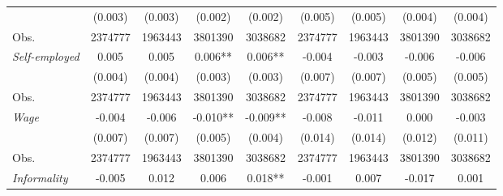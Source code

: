 \begin{tabular}{lcccccccc}
						&   \tiny{(0.003)}   &
						    \tiny{(0.003)}   &
						    \tiny{(0.002)}   &
						    \tiny{(0.002)}   &
						    \tiny{(0.005)}   &
						    \tiny{(0.005)}   &
						    \tiny{(0.004)}   &
						    \tiny{(0.004)}   \\


Obs.					&	\tiny{2374777}   &
						    \tiny{1963443}   &
						    \tiny{3801390}   &
						    \tiny{3038682}   &
						    \tiny{2374777}   &
						    \tiny{1963443}   &
						    \tiny{3801390}   &
						    \tiny{3038682}   \\



\textit{Self-employed}   &  0.005   &
						   0.005   &
						   0.006**   &
						   0.006**   &
						   -0.004   &
						   -0.003   &
						   -0.006   &
						   -0.006   \\
						   
						&   \tiny{(0.004)}   &
						    \tiny{(0.004)}   &
						    \tiny{(0.003)}   &
						    \tiny{(0.003)}   &
						    \tiny{(0.007)}   &
						    \tiny{(0.007)}   &
						    \tiny{(0.005)}   &
						    \tiny{(0.005)}   \\

Obs.					&	\tiny{2374777}   &
						    \tiny{1963443}   &
						    \tiny{3801390}   &
						    \tiny{3038682}   &
						    \tiny{2374777}   &
						    \tiny{1963443}   &
						    \tiny{3801390}   &
						    \tiny{3038682}   \\



\textit{Wage}   &  -0.004   &
						   -0.006   &
						   -0.010**   &
						   -0.009**   &
						   -0.008   &
						   -0.011   &
						   0.000   &
						   -0.003   \\
						   
						&   \tiny{(0.007)}   &
						    \tiny{(0.007)}   &
						    \tiny{(0.005)}   &
						    \tiny{(0.004)}   &
						    \tiny{(0.014)}   &
						    \tiny{(0.014)}   &
						    \tiny{(0.012)}   &
						    \tiny{(0.011)}   \\

Obs.					&	\tiny{2374777}   &
						    \tiny{1963443}   &
						    \tiny{3801390}   &
						    \tiny{3038682}   &
						    \tiny{2374777}   &
						    \tiny{1963443}   &
						    \tiny{3801390}   &
						    \tiny{3038682}   \\



\textit{Informality}   &  -0.005   &
						   0.012   &
						   0.006   &
						   0.018**   &
						   -0.001   &
						   0.007   &
						   -0.017   &
						   0.001   \\
						   

\end{tabular}
